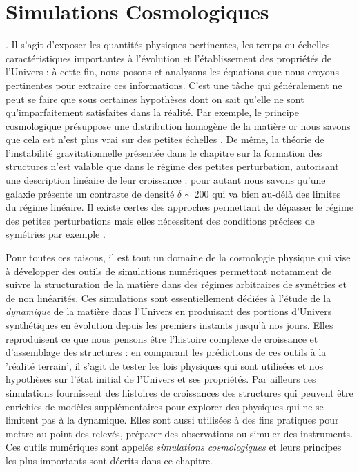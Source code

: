 \chapter{Simulations Cosmologiques}

. Il s'agit d'exposer les quantités physiques pertinentes, les temps ou échelles caractéristiques importantes à l'évolution et l'établissement des propriétés de l'Univers : à cette fin, nous posons et analysons les équations que nous croyons pertinentes pour extraire ces informations. C'est une tâche qui généralement ne peut se faire que sous certaines hypothèses dont on sait qu'elle ne sont qu'imparfaitement satisfaites dans la réalité. Par exemple, le principe cosmologique présuppose une distribution homogène de la matière or nous savons que cela est n'est plus vrai sur des petites échelles .  De même, la théorie de l'instabilité gravitationnelle présentée dans le chapitre sur la formation des structures n'est valable que dans le régime des petites perturbation, autorisant une description linéaire de leur croissance : pour autant nous savons qu'une galaxie présente un contraste de densité $\delta \sim 200$ qui va bien au-délà des limites du régime linéaire. Il existe certes des approches permettant de dépasser le régime des petites perturbations mais elles nécessitent des conditions précises de symétries par exemple .


Pour toutes ces raisons, il est tout un domaine de la cosmologie physique qui vise à développer des outils de simulations numériques permettant notamment de suivre la structuration de la matière dans des régimes arbitraires de symétries et de non linéarités. Ces simulations sont essentiellement dédiées à l'étude de la \textit{dynamique} de la matière dans l'Univers en produisant des portions d'Univers synthétiques en évolution depuis les premiers instants jusqu'à nos jours. Elles reproduisent ce que nous pensons être l'histoire complexe de croissance et d'assemblage des structures : en comparant les prédictions de ces outils à la 'réalité terrain', il s'agit de tester les lois physiques qui sont utilisées et nos hypothèses sur l'état initial de l'Univers et ses propriétés. Par ailleurs ces simulations fournissent des histoires de croissances des structures qui peuvent être enrichies de modèles supplémentaires pour explorer des physiques qui ne se limitent pas à la dynamique. Elles sont aussi utilisées à des fins pratiques pour mettre au point des relevés, préparer des observations ou simuler des instruments. Ces outils numériques sont appelés \textit{simulations cosmologiques} et leurs principes les plus importants sont décrits dans ce chapitre.


